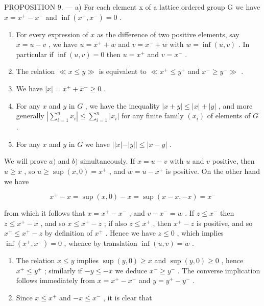 PROPOSITION 9. --- a) For each element x of a lattice ordered group G we have \(x = x^{+} - x^{-}\) and \(\inf(x^{+}, x^{-}) = 0\) .

\begin{enumerate}
\def\labelenumi{\alph{enumi})}
\setcounter{enumi}{1}
\item
  For every expression of \(x\) as the difference of two positive elements, say \(x = u - v\) , we have \(u = x^{+} + w\) and \(v = x^{-} + w\) with \(w = \inf(u, v)\) . In particular if \(\inf(u, v) = 0\) then \(u = x^{+}\) and \(v = x^{-}\) .
\item
  The relation \(\ll x\leqslant y\gg\) is equivalent to \(\ll x^{+}\leqslant y^{+}\) and \(x^{-}\geqslant y^{-}\gg\) .
\item
  We have \(|x| = x^{+} + x^{-} \geqslant 0\) .
\item
  For any \(x\) and \(y\) in \(G\) , we have the inequality \(|x + y| \leqslant |x| + |y|\) , and more generally \(\left|\sum_{i=1}^{n} x_i\right| \leqslant \sum_{i=1}^{n} |x_i|\) for any finite family \((x_i)\) of elements of \(G\) .
\item
  For any \(x\) and \(y\) in \(G\) we have \(||x| - |y|| \leqslant |x - y|\) .
\end{enumerate}

We will prove \(a)\) and \(b)\) simultaneously. If \(x = u - v\) with \(u\) and \(v\) positive, then \(u \geqslant x\) , so \(u \geqslant \sup (x, 0) = x^{+}\) , and \(w = u - x^{+}\) is positive. On the other hand we have

\[
x ^ {+} - x = \sup (x, 0) - x = \sup (x - x, - x) = x ^ {-}
\]

from which it follows that \(x = x^{+} - x^{-}\) , and \(v - x^{-} = w\) . If \(z \leqslant x^{-}\) then \(z \leqslant x^{+} - x\) , and so \(x \leqslant x^{+} - z\) ; if also \(z \leqslant x^{+}\) , then \(x^{+} - z\) is positive, and so \(x^{+} \leqslant x^{+} - z\) by definition of \(x^{+}\) . Hence we have \(z \leqslant 0\) , which implies \(\inf(x^{+}, x^{-}) = 0\) , whence by translation \(\inf(u, v) = w\) .

\begin{enumerate}
\def\labelenumi{\alph{enumi})}
\setcounter{enumi}{2}
\item
  The relation \(x \leqslant y\) implies \(\sup (y, 0) \geqslant x\) and \(\sup (y, 0) \geqslant 0\) , hence \(x^{+} \leqslant y^{+}\) ; similarly if \(-y \leqslant -x\) we deduce \(x^{-} \geqslant y^{-}\) . The converse implication follows immediately from \(x = x^{+} - x^{-}\) and \(y = y^{+} - y^{-}\) .
\item
  Since \(x \leqslant x^{+}\) and \(-x \leqslant x^{-}\) , it is clear that
\end{enumerate}

